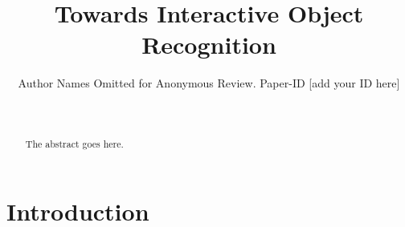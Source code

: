 \documentclass[conference]{IEEEtran}
\begin{document}
    \title{Towards Interactive Object Recognition}

    \author{Author Names Omitted for Anonymous Review. Paper-ID [add your ID here]}





    \author{\\
    }

    \maketitle

\begin{abstract}
    The abstract goes here.
\end{abstract}

\IEEEpeerreviewmaketitle

\section{Introduction}
\end{document}
